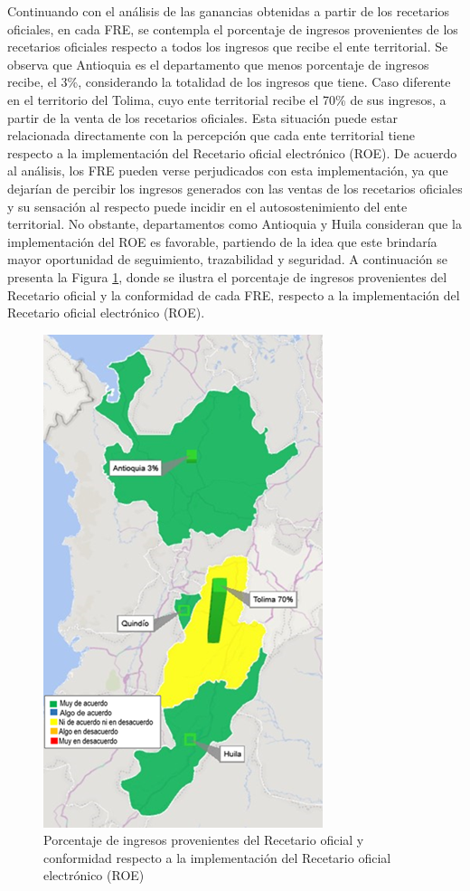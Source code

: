 \documentclass[
]{book}
\begin{document}
Continuando con el análisis de las ganancias obtenidas a partir de los recetarios oficiales, en cada FRE, se contempla el porcentaje de ingresos provenientes de los recetarios oficiales respecto a todos los ingresos que recibe el ente territorial. Se observa que Antioquia es el departamento que menos porcentaje de ingresos recibe, el 3\%, considerando la totalidad de los ingresos que tiene. Caso diferente en el territorio del Tolima, cuyo ente territorial recibe el 70\% de sus ingresos, a partir de la venta de los recetarios oficiales. Esta situación puede estar relacionada directamente con la percepción que cada ente territorial tiene respecto a la implementación del Recetario oficial electrónico (ROE). De acuerdo al análisis, los FRE pueden verse perjudicados con esta implementación, ya que dejarían de percibir los ingresos generados con las ventas de los recetarios oficiales y su sensación al respecto puede incidir en el autosostenimiento del ente territorial. No obstante, departamentos como Antioquia y Huila consideran que la implementación del ROE es favorable, partiendo de la idea que este brindaría mayor oportunidad de seguimiento, trazabilidad y seguridad. A continuación se presenta la Figura \ref{fig:PorcIngresosProcRegionAndinaSur}, donde se ilustra el porcentaje de ingresos provenientes del Recetario oficial y la conformidad de cada FRE, respecto a la implementación del Recetario oficial electrónico (ROE).

\begin{figure}

{\centering \includegraphics[width=0.5\linewidth]{figures/Imagen13} 

}

\caption{Porcentaje de ingresos provenientes del Recetario oficial y conformidad respecto a la implementación del Recetario oficial electrónico (ROE)}\label{fig:PorcIngresosProcRegionAndinaSur}
\end{figure}
\end{document}
